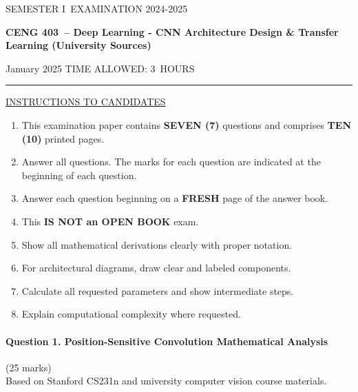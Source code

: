 \documentclass[12pt]{article}
\newcommand{\masunitnumber}{CENG 403}
\newcommand{\examdate}{January 2025}
\newcommand{\academicyear}{2024-2025}
\newcommand{\semester}{I}
\newcommand{\coursename}{Deep Learning - CNN Architecture Design \& Transfer Learning (University Sources)}
\newcommand{\numberofhours}{3}
\begin{document}
\setlength{\headsep}{5truemm}
\setlength{\headheight}{14.5truemm}
\setlength{\voffset}{-0.45truein}
\renewcommand{\headrulewidth}{0.0pt}
\begin{center}
SEMESTER \semester\ EXAMINATION \academicyear
\end{center}
\begin{center}
{\bf \masunitnumber\ -- \coursename}
\end{center}
\vspace{20truemm}
\noindent \examdate\hspace{45truemm} TIME ALLOWED: \numberofhours\ HOURS
\vspace{19truemm}
\hrule
\vspace{19truemm}
\noindent\underline{INSTRUCTIONS TO CANDIDATES}
\vspace{8truemm}
\begin{enumerate}
\item This examination paper contains {\bf SEVEN (7)} questions and comprises 
{\bf TEN (10)} printed pages.
\item Answer all questions. 
The marks for each question are indicated at the beginning of each question.
\item Answer each question beginning on a {\bf FRESH} page of the answer book.
\item This {\bf IS NOT an OPEN BOOK} exam.
\item Show all mathematical derivations clearly with proper notation.
\item For architectural diagrams, draw clear and labeled components.
\item Calculate all requested parameters and show intermediate steps.
\item Explain computational complexity where requested.
\end{enumerate}
\newpage
\lhead{}
\rhead{\masunitnumber}
\chead{}
\lfoot{}
\cfoot{\thepage}
\rfoot{}
\setlength{\footskip}{45pt}

\paragraph{Question 1. Position-Sensitive Convolution Mathematical Analysis}{{\hfill (25 marks)}}\\
Based on Stanford CS231n and university computer vision course materials.
\end{document}
